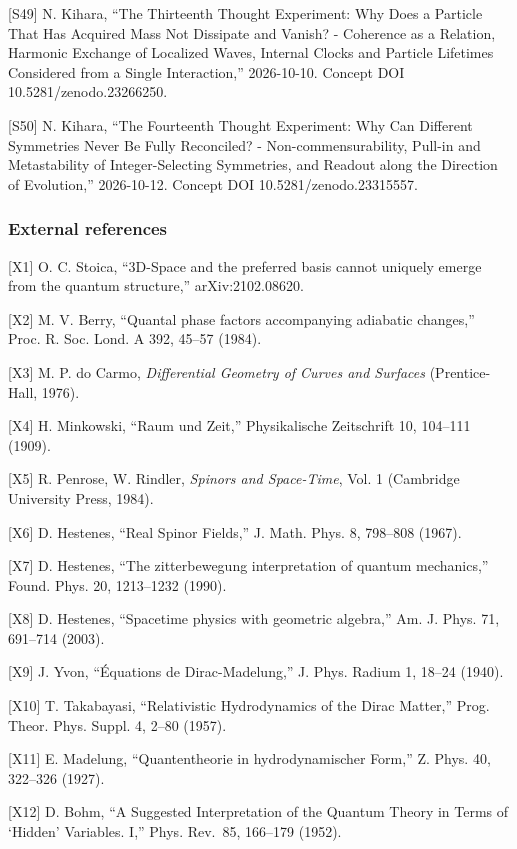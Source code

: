 \documentclass[
  a4paper,
]{article}
\begin{document}
{[}S49{]} N. Kihara, ``The Thirteenth Thought Experiment: Why Does a
Particle That Has Acquired Mass Not Dissipate and Vanish? - Coherence as
a Relation, Harmonic Exchange of Localized Waves, Internal Clocks and
Particle Lifetimes Considered from a Single Interaction,'' 2026-10-10.
Concept DOI 10.5281/zenodo.23266250.

{[}S50{]} N. Kihara, ``The Fourteenth Thought Experiment: Why Can
Different Symmetries Never Be Fully Reconciled? - Non-commensurability,
Pull-in and Metastability of Integer-Selecting Symmetries, and Readout
along the Direction of Evolution,'' 2026-10-12. Concept DOI
10.5281/zenodo.23315557.

\subsubsection{External references}\label{external-references}

{[}X1{]} O. C. Stoica, ``3D-Space and the preferred basis cannot
uniquely emerge from the quantum structure,'' arXiv:2102.08620.

{[}X2{]} M. V. Berry, ``Quantal phase factors accompanying adiabatic
changes,'' Proc. R. Soc. Lond. A 392, 45--57 (1984).

{[}X3{]} M. P. do Carmo, \emph{Differential Geometry of Curves and
Surfaces} (Prentice-Hall, 1976).

{[}X4{]} H. Minkowski, ``Raum und Zeit,'' Physikalische Zeitschrift 10,
104--111 (1909).

{[}X5{]} R. Penrose, W. Rindler, \emph{Spinors and Space-Time}, Vol. 1
(Cambridge University Press, 1984).

{[}X6{]} D. Hestenes, ``Real Spinor Fields,'' J. Math. Phys. 8, 798--808
(1967).

{[}X7{]} D. Hestenes, ``The zitterbewegung interpretation of quantum
mechanics,'' Found. Phys. 20, 1213--1232 (1990).

{[}X8{]} D. Hestenes, ``Spacetime physics with geometric algebra,'' Am.
J. Phys. 71, 691--714 (2003).

{[}X9{]} J. Yvon, ``Équations de Dirac-Madelung,'' J. Phys. Radium 1,
18--24 (1940).

{[}X10{]} T. Takabayasi, ``Relativistic Hydrodynamics of the Dirac
Matter,'' Prog. Theor. Phys. Suppl. 4, 2--80 (1957).

{[}X11{]} E. Madelung, ``Quantentheorie in hydrodynamischer Form,'' Z.
Phys. 40, 322--326 (1927).

{[}X12{]} D. Bohm, ``A Suggested Interpretation of the Quantum Theory in
Terms of `Hidden' Variables. I,'' Phys. Rev.~85, 166--179 (1952).
\end{document}
